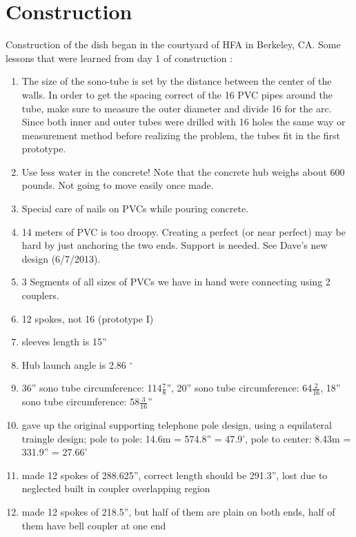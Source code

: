 \documentclass[11pt]{article}
\begin{document}
\section{Construction}
Construction of the dish began in the courtyard of HFA in Berkeley, CA.
Some lessons that were learned from day 1 of construction :
\begin{enumerate}
    \item{The size of the sono-tube is set by the distance between the center of
the walls. In order to get the spacing correct of the 16 PVC pipes around the
tube, make sure to measure the outer diameter and divide 16 for the arc. Since both inner
and outer tubes were drilled with 16 holes the same way or measurement
method before realizing the problem, the tubes fit in the first
prototype.}
    \item{Use less water in the concrete! Note that the concrete hub weighs
about 600 pounds. Not going to move easily once made.}
    \item{Special care of nails on PVCs while pouring concrete.}
    \item{14 meters of PVC is too droopy. Creating a perfect (or near perfect)
may be hard by just anchoring the two ends. Support is needed. See Dave's new
design (6/7/2013).}
    \item{3 Segments of all sizes of PVCs we have in hand were
      connecting using 2 couplers.}

    \item{12 spokes, not 16 (prototype I)}
    \item{sleeves length is 15''}
    \item{Hub launch angle is 2.86 $^{\circ}$}
    \item{36'' sono tube circumference: 114$\frac{7}{8}$'', 20'' sono
      tube circumference: 64$\frac{2}{16}$, 18'' sono tube
      circumference: 58$\frac{3}{16}$''}
    \item{gave up the original supporting telephone pole design, using a
    equilateral traingle design; pole to pole: 14.6m = 574.8'' = 47.9',
    pole to center: 8.43m = 331.9'' =  27.66'}
    \item{made 12 spokes of 288.625'', correct length should be 291.3'',
    lost due to neglected built in coupler overlapping region}
    \item{made 12 spokes of 218.5'', but half of them are plain on both
      ends, half of them have bell coupler at one end}

\end{enumerate}
\end{document}
